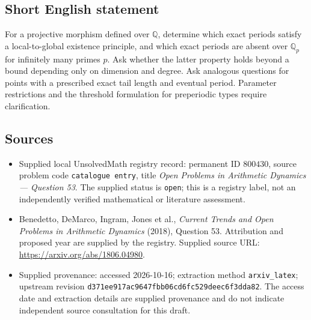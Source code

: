 \documentclass[11pt]{article}
\newcommand{\Q}{\mathbb{Q}}
\begin{document}
\subsection{Short English statement}
For a projective morphism defined over \(\Q\), determine which exact periods satisfy a local-to-global existence principle, and which exact periods are absent over \(\Q_p\) for infinitely many primes \(p\). Ask whether the latter property holds beyond a bound depending only on dimension and degree. Ask analogous questions for points with a prescribed exact tail length and eventual period. Parameter restrictions and the threshold formulation for preperiodic types require clarification.
\subsection{Sources}
\begin{itemize}
\item Supplied local UnsolvedMath registry record: permanent ID \(800430\), source problem code \texttt{catalogue entry}, title \emph{Open Problems in Arithmetic Dynamics --- Question 53}. The supplied status is \texttt{open}; this is a registry label, not an independently verified mathematical or literature assessment.
\item Benedetto, DeMarco, Ingram, Jones et al., \emph{Current Trends and Open Problems in Arithmetic Dynamics} (2018), Question 53. Attribution and proposed year are supplied by the registry. Supplied source URL: \url{https://arxiv.org/abs/1806.04980}.
\item Supplied provenance: accessed 2026-10-16; extraction method \texttt{arxiv\_latex}; upstream revision \texttt{d371ee917ac9647fbb06cd6fc529deec6f3dda82}. The access date and extraction details are supplied provenance and do not indicate independent source consultation for this draft.
\end{itemize}
\end{document}
